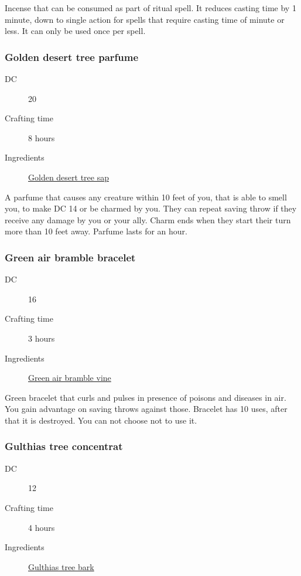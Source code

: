 Incense that can be consumed as part of ritual spell. It reduces casting time by 1 minute, down to single action for spells that require casting time of minute or less. It can only be used once per spell.

\subsubsection{Golden desert tree parfume}
\label{Golden desert tree parfume}

\begin{description}
\item [DC] 20 \nature
\item [Crafting time] 8 hours
\item [Ingredients] \hyperref[Golden Desert Tree]{Golden desert tree sap}
\end{description}

A parfume that causes any creature within 10 feet of you, that is able to smell you, to make DC 14 \charismasave{} or be charmed by you. They can repeat saving throw if they receive any damage by you 
 or your ally. Charm ends when they start their turn more than 10 feet away. Parfume lasts for an hour.

\subsubsection{Green air bramble bracelet}
\label{Green air bramble bracelet}

\begin{description}
\item [DC] 16 \survival
\item [Crafting time] 3 hours
\item [Ingredients] \hyperref[Green Air Bramble]{Green air bramble vine}
\end{description}

Green bracelet that curls and pulses in presence of poisons and diseases in air. 
You gain advantage on saving throws against those. 
Bracelet has 10 uses, after that it is destroyed. You can not choose not to use it.

\subsubsection{Gulthias tree concentrat}
\label{Gulthias tree concentrat}

\begin{description}
\item [DC] 12 \nature
\item [Crafting time] 4 hours
\item [Ingredients] \hyperref[Gulthias Tree]{Gulthias tree bark}
\end{description}

